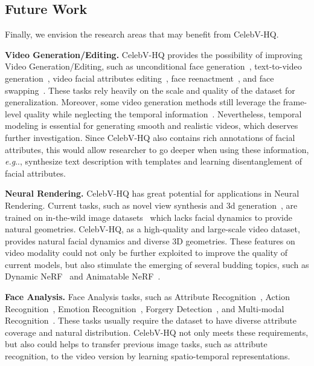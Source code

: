\documentclass[runningheads]{llncs}
\makeatletter
\DeclareRobustCommand\onedot{\futurelet\@let@token\@onedot}
\def\@onedot{\ifx\@let@token.\else.\null\fi\xspace}
\def\eg{\emph{e.g}\onedot} \def\Eg{\emph{E.g}\onedot}
\makeatother
\begin{document}
\subsection{Future Work}
\begin{sloppypar}
    
Finally, we envision the research areas that may benefit from CelebV-HQ. 



\noindent
\textbf{Video Generation/Editing.}
CelebV-HQ provides the possibility of improving Video Generation/Editing, such as unconditional face generation~\cite{gan,dcgan,stylegan,stylegan2,mocoganhd,digan,styleganv}, text-to-video generation~\cite{li2018video,nuwa,videodiffusion,cogvideo,text2live}, video facial attributes editing~\cite{starganv2,munit,interfacegan,e4e,xu2022transeditor}, face reenactment~\cite{wayne2018reenactgan,fomm,bilayermodel,wang2021facevid2vid}, and face swapping~\cite{li2019faceshifter,zhu2020aot,Gao_2021_CVPR,nirkin2019fsgan,xu2022mobilefaceswap}. 
These tasks rely heavily on the scale and quality of the dataset for generalization. 
Moreover, some video generation methods still leverage the frame-level quality while neglecting the temporal information~\cite{siarohin2021motion,wang2021one,Zhou_2021_CVPR}. Nevertheless, temporal modeling is essential for generating smooth and realistic videos, which deserves further investigation. 
Since CelebV-HQ also contains rich annotations of facial attributes, this would allow researcher to go deeper when using these information, \eg, synthesize text description with templates and learning disentanglement of facial attributes.

\noindent
\textbf{Neural Rendering.} CelebV-HQ has great potential for applications in Neural Rendering. Current tasks, such as novel view synthesis \cite{headnerf,stylenerf,or2021stylesdf,DBLP:journals/corr/abs-2204-11798,DBLP:journals/corr/abs-2201-07786} and 3d generation~\cite{chan2021pigan,or2021stylesdf,eg3d,guo2021adnerf,Gafni_2021_CVPR,chen2022sem2nerf}, are trained on in-the-wild image datasets~\cite{celebahq,stylegan} which lacks facial dynamics to provide natural geometries.
CelebV-HQ, as a high-quality and large-scale video dataset, provides natural facial dynamics and diverse 3D geometries. These features on video modality could not only be further exploited to improve the quality of current models, but also stimulate the emerging of several budding topics, such as Dynamic NeRF~\cite{pumarola2021d} and Animatable NeRF~\cite{peng2021animatable}.


\noindent
\textbf{Face Analysis.} Face Analysis tasks, such as Attribute Recognition~\cite{zhong2016face,ding2018deep,fairface}, Action Recognition~\cite{wang2013action,jegham2020vision}, Emotion Recognition~\cite{dzedzickis2020human,lee2019context}, Forgery Detection~\cite{li2020face,haliassos2021lips,zhu2021face}, and Multi-modal Recognition~\cite{zhang2020emotion,munro2020multi}. These tasks usually require the dataset to have diverse attribute coverage and natural distribution. 
CelebV-HQ not only meets these requirements, but also could helps to transfer previous image tasks, such as attribute recognition, to the video version by learning spatio-temporal representations. 
\end{sloppypar}
\end{document}
